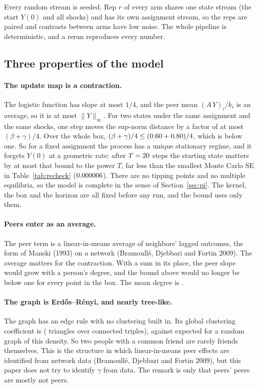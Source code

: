 \documentclass[11pt]{article}
\begin{document}
Every random stream is seeded. Rep $r$ of every arm shares one state
stream (the start $Y(0)$ and all shocks) and has its own assignment stream,
so the reps are paired and contrasts between arms have low noise. The
whole pipeline is deterministic, and a rerun reproduces every number.

\subsection{Three properties of the model}
\label{sec:props}

\paragraph{The update map is a contraction.}
The logistic function has slope at most $1/4$, and the peer mean
$(A\,Y)_i/k_i$ is an average, so it is at most $\|Y\|_\infty$. For two
states under the same assignment and the same shocks, one step moves the
sup-norm distance by a factor of at most $(\beta+\gamma)/4$. Over the
whole box, $(\beta+\gamma)/4\le(0.60+0.80)/4$, which is
below one. So for a fixed assignment the process has a unique stationary
regime, and it forgets $Y(0)$ at a geometric rate: after
$T=20$ steps the starting state matters by at most that bound to
the power $T$, far less than the smallest Monte Carlo SE in Table~\ref{tab:recheck}
($0.000006$). There are no tipping points and no multiple
equilibria, so the model is complete in the sense of
Section~\ref{sec:pi}. The kernel, the box and the horizon are all fixed
before any run, and the bound uses only them.

\paragraph{Peers enter as an average.}
The peer term is a linear-in-means average of neighbors' lagged
outcomes, the form of Manski (1993) on a network
(Bramoull\'e, Djebbari and Fortin 2009). The average matters for the
contraction. With a sum in its place, the peer slope would grow with
a person's degree, and the bound above would no longer be below one
for every point in the box. The mean degree is \MeanDegree.

\paragraph{The graph is Erd\H{o}s--R\'enyi, and nearly tree-like.}
The graph has an edge rule with no clustering built in. Its global
clustering coefficient is \GlobalClustering{} (\Triangles{} triangles
over \ConnectedTriples{} connected triples), against \GlobalClusteringTheory{}
expected for a random graph of this density. So two people with a common
friend are rarely friends themselves. This is the structure in which
linear-in-means peer effects are identified from network data
(Bramoull\'e, Djebbari and Fortin 2009), but this paper does not try
to identify $\gamma$ from data. The remark is only that peers' peers
are mostly not peers.
\end{document}

